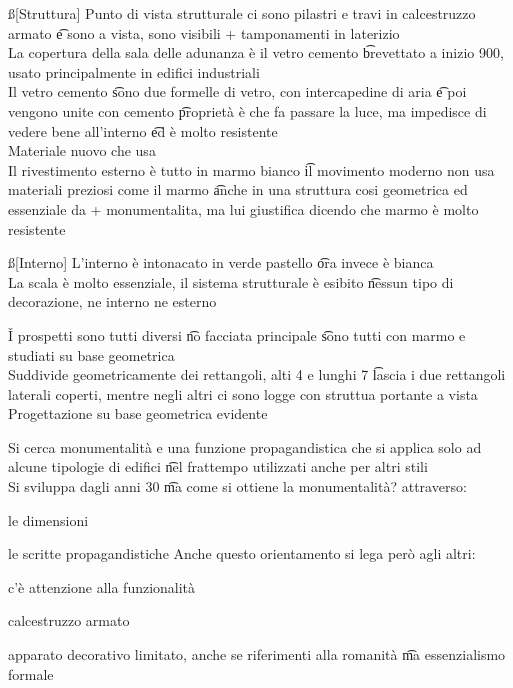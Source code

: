 \documentclass[12pt]{article}
\begin{document}
\ss[Struttura]
Punto di vista strutturale ci sono pilastri e travi in calcestruzzo armato \t e sono a vista, sono visibili + tamponamenti in laterizio \\
La copertura della sala delle adunanza è il vetro cemento \t brevettato a inizio 900, usato principalmente in edifici industriali \\
Il vetro cemento \t sono due formelle di vetro, con intercapedine di aria \t e poi vengono unite con cemento \t proprietà è che fa passare la luce, ma impedisce di vedere bene all'interno \t ed è molto resistente \\
Materiale nuovo che usa \\
Il rivestimento esterno è tutto in marmo bianco \t il movimento moderno non usa materiali preziosi come il marmo \t anche in una struttura cosi geometrica ed essenziale da + monumentalita, ma lui giustifica dicendo che marmo è molto resistente \

\ss[Interno]
L'interno è intonacato in verde pastello \t ora invece è bianca \\
La scala è molto essenziale, il sistema strutturale è esibito \t nessun tipo di decorazione, ne interno ne esterno

\v

I prospetti sono tutti diversi \t no facciata principale \t sono tutti con marmo e studiati su base geometrica \\
Suddivide geometricamente dei rettangoli, alti 4 e lunghi 7 \t lascia i due rettangoli laterali coperti, mentre negli altri ci sono logge con struttua portante a vista \\
Progettazione su base geometrica evidente

\newpage
{}
Si cerca monumentalità e una funzione propagandistica che si applica solo ad alcune tipologie di edifici \t nel frattempo utilizzati anche per altri stili \\
Si sviluppa dagli anni 30 \t ma come si ottiene la monumentalità? attraverso:
\bi
  \item le dimensioni
  \item le scritte propagandistiche
\ei
Anche questo orientamento si lega però agli altri:
\bi
  \item c'è attenzione alla funzionalità
  \item calcestruzzo armato
  \item apparato decorativo limitato, anche se riferimenti alla romanità \t ma essenzialismo formale
\ei
\end{document}
